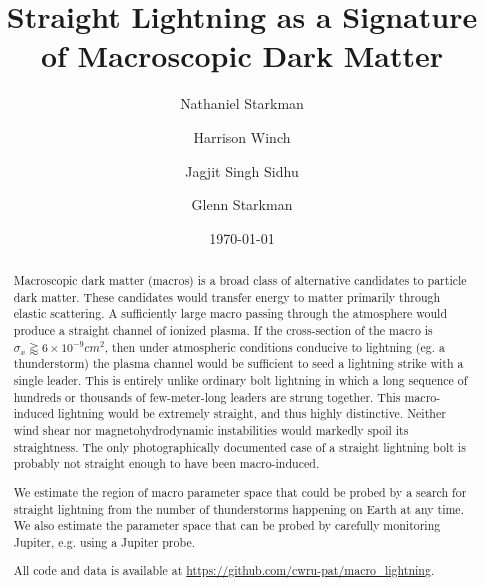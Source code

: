 \documentclass[%
 reprint,
 amsmath,amssymb,
 aps,
 nofootinbib, %
]{revtex4-2}
\begin{document}

\title{Straight Lightning as a Signature of Macroscopic Dark Matter}

\author{Nathaniel Starkman}
%
\author{Harrison Winch}
%

\author{Jagjit Singh Sidhu}
\author{Glenn Starkman}

\date{\today}


\begin{abstract}

    Macroscopic dark matter (macros) is a broad class of alternative candidates to particle dark matter. These candidates would transfer energy to matter primarily through elastic scattering. A sufficiently large macro passing through the atmosphere would produce a straight channel of ionized plasma. If the cross-section of the macro is $\sigma_x\gtrapprox6\times10^{-9}cm^2$, then under atmospheric conditions conducive to lightning (eg. a thunderstorm) the plasma channel would be sufficient to seed a lightning strike with a single leader. This is entirely unlike ordinary bolt lightning in which a long sequence of hundreds or thousands of few-meter-long leaders are strung together. This macro-induced lightning would be extremely straight, and thus highly distinctive. Neither wind shear nor magnetohydrodynamic instabilities would markedly spoil its straightness. The only photographically documented case of a straight lightning bolt is probably not straight enough to have been macro-induced.

    We estimate the region of macro parameter space that could be probed by a search for straight lightning from the number of thunderstorms happening on Earth at any time. We also estimate the parameter space that can be probed by carefully monitoring Jupiter, e.g. using a Jupiter probe.

    All code and data is available at \url{https://github.com/cwru-pat/macro_lightning}.

\end{abstract}
\end{document}
